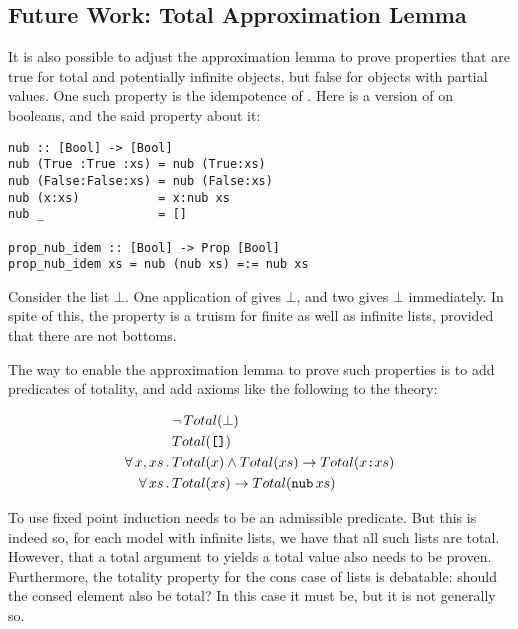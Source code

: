 \subsection{Future Work: Total Approximation Lemma}

It is also possible to adjust the approximation lemma to prove
properties that are true for total and potentially infinite objects,
but false for objects with partial values. One such property is the
idempotence of . Here is a version of  on booleans,
and the said property about it:

\begin{verbatim}
nub :: [Bool] -> [Bool]
nub (True :True :xs) = nub (True:xs)
nub (False:False:xs) = nub (False:xs)
nub (x:xs)           = x:nub xs
nub _                = []

prop_nub_idem :: [Bool] -> Prop [Bool]
prop_nub_idem xs = nub (nub xs) =:= nub xs
\end{verbatim}

Consider the list $\bot$. One application of 
gives $\bot$, and two gives $\bot$ immediately. In spite of
this, the property is a truism for finite as well as infinite lists,
provided that there are not bottoms.

The way to enable the approximation lemma to prove such properties is
to add predicates of totality, and add axioms like the following to
the theory:

\begin{align*}
            & \neg \, Total(\bot) \\
            & Total(\hs{[]}) \\
\faa{x}{xs} & Total(x) \wedge Total(xs) \rightarrow Total(x\hs{:}xs) \\
\fa{xs}     & Total(xs) \rightarrow Total(\hs{nub} \, xs) \\
\end{align*}

To use fixed point induction  needs to be an admissible
predicate. But this is indeed so, for each model with infinite lists,
we have that all such lists are total.  However, that a total argument
to  yields a total value also needs to be proven. Furthermore,
the totality property for the cons case of lists is debatable: should
the consed element also be total? In this case it must be, but it is
not generally so.

